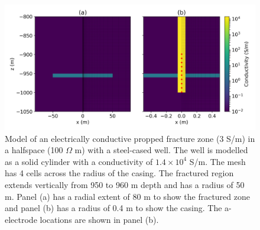 \begin{figure}
    \begin{center}
    \includegraphics[width=\textwidth]{figures/inversion/DC_cyl_setup.png}
    \end{center}
\caption{
    Model of an electrically conductive propped fracture zone (3 S/m) in a halfspace (100 $\Omega$ m) with a steel-cased well.
    The well is modelled as a solid cylinder with a conductivity of $1.4 \times 10^4$ S/m. The mesh has 4 cells across the
    radius of the casing. The fractured region extends vertically from 950 to 960 m depth and has a radius of 50 m.
    Panel (a) has a radial extent of 80 m to show the fractured zone and panel (b) has a radius of 0.4 m to show the casing.
    The a-electrode locations are shown in panel (b).
}
\label{fig:DC_cyl_setup}
\end{figure}
